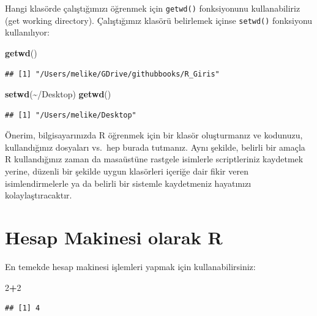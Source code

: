 \documentclass[
]{book}
\newenvironment{Shaded}{\begin{snugshade}}{\end{snugshade}}
\newcommand{\DecValTok}[1]{\textcolor[rgb]{0.00,0.00,0.81}{#1}}
\newcommand{\KeywordTok}[1]{\textcolor[rgb]{0.13,0.29,0.53}{\textbf{#1}}}
\newcommand{\NormalTok}[1]{#1}
\newcommand{\OperatorTok}[1]{\textcolor[rgb]{0.81,0.36,0.00}{\textbf{#1}}}
\newcommand{\StringTok}[1]{\textcolor[rgb]{0.31,0.60,0.02}{#1}}
\begin{document}
Hangi klasörde çalıştığımızı öğrenmek için \texttt{getwd()} fonksiyonunu kullanabiliriz (get working directory). Çalıştığımız klasörü belirlemek içinse \texttt{setwd()} fonksiyonu kullanılıyor:

\begin{Shaded}
\begin{Highlighting}[]
\KeywordTok{getwd}\NormalTok{()}
\end{Highlighting}
\end{Shaded}

\begin{verbatim}
## [1] "/Users/melike/GDrive/githubbooks/R_Giris"
\end{verbatim}

\begin{Shaded}
\begin{Highlighting}[]
\KeywordTok{setwd}\NormalTok{(}\StringTok{\textquotesingle{}\textasciitilde{}/Desktop\textquotesingle{}}\NormalTok{)}
\KeywordTok{getwd}\NormalTok{()}
\end{Highlighting}
\end{Shaded}

\begin{verbatim}
## [1] "/Users/melike/Desktop"
\end{verbatim}

Önerim, bilgisayarınızda R öğrenmek için bir klasör oluşturmanız ve kodunuzu, kullandığınız dosyaları vs.~hep burada tutmanız. Aynı şekilde, belirli bir amaçla R kullandığınız zaman da masaüstüne rastgele isimlerle scriptleriniz kaydetmek yerine, düzenli bir şekilde uygun klasörleri içeriğe dair fikir veren isimlendirmelerle ya da belirli bir sistemle kaydetmeniz hayatınızı kolaylaştıracaktır.

\hypertarget{hesap-makinesi-olarak-r}{%
\section{Hesap Makinesi olarak R}\label{hesap-makinesi-olarak-r}}

En temekde hesap makinesi işlemleri yapmak için kullanabilirsiniz:

\begin{Shaded}
\begin{Highlighting}[]
\DecValTok{2}\OperatorTok{+}\DecValTok{2}
\end{Highlighting}
\end{Shaded}

\begin{verbatim}
## [1] 4
\end{verbatim}
\end{document}

